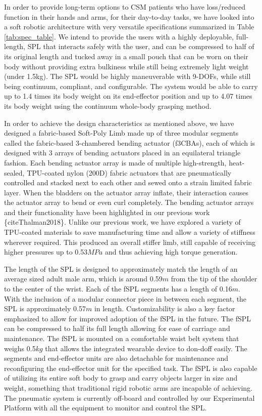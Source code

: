 \documentclass[letterpaper, 10 pt, conference]{ieeeconf}  %
\begin{document}
In order to provide long-term options to CSM patients who have loss/reduced function in their hands and arms, for their day-to-day tasks, we have looked into a soft robotic architecture with very versatile specifications summarized in Table \ref{tab:spec_table}. We intend to provide the users with a highly deployable, full-length, SPL that interacts safely with the user, and can be compressed to half of its original length and tucked away in a small pouch that can be worn on their body without providing extra bulkiness while still being extremely light weight (under 1.5kg). The SPL would be highly maneuverable with 9-DOFs, while still being continuum, compliant, and configurable. The system would be able to carry up to 1.4 times its body weight on its end-effector position and up to 4.07 times its body weight using the continuum whole-body grasping method. 

In order to achieve the design characteristics as mentioned above, we have designed a fabric-based Soft-Poly Limb made up of three modular segments called the fabric-based 3-chambered bending actuator (f3CBAs), each of which is designed with 3 arrays of bending actuators placed in an equilateral triangle fashion. Each bending actuator array is made of multiple high-strength, heat-sealed, TPU-coated nylon (200D) fabric actuators that are pneumatically controlled and stacked next to each other and sewed onto a strain limited fabric layer. When the bladders on the actuator array inflate, their interaction causes the actuator array to bend or even curl completely. The bending actuator arrays and their functionality have been highlighted in our previous work \{cite{Thalman2018}\}. Unlike our previous work, we have explored a variety of TPU-coated materials to save manufacturing time and allow a variety of stiffness wherever required. This produced an overall stiffer limb, still capable of receiving higher pressures up to 0.53$MPa$ and thus achieving high torque generation.

The length of the SPL is designed to approximately match the length of an average sized adult male arm, which is around 0.59$m$ from the tip of the shoulder to the center of the wrist. Each of the fSPL segments has a length of 0.16$m$. With the inclusion of a modular connector piece in between each segment, the SPL is approximately 0.57$m$ in length.  Customizability is also a key factor emphasized to allow for improved adoption of the fSPL in the future. The fSPL can be compressed to half its full length allowing for ease of carriage and maintenance. The fSPL is mounted on a comfortable waist belt system that weighs 0.5$kg$ that allows the integrated wearable device to don-doff easily. The segments and end-effector units are also detachable for maintenance and reconfiguring the end-effector unit for the specified task. The fSPL is also capable of utilizing its entire soft body to grasp and carry objects larger in size and weight, something that traditional rigid robotic arms are incapable of achieving. The pneumatic system is currently off-board and controlled by our Experimental Platform with all the equipment to monitor and control the SPL. 
\end{document}
